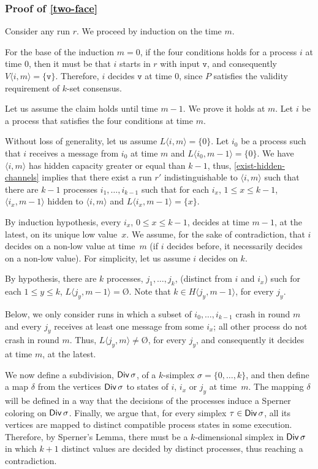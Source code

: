 \documentclass[11pt]{article}
\theoremstyle{definition}
\newcommand{\set}[1]{\{#1\}}
\def\emptyset{\mbox{\O}}
\DeclareMathOperator{\Div}{\sf Div}
\newcommand{\ang}[1]{\langle{#1}\rangle}
\begin{document}
\subsubsection{Proof of \texorpdfstring{\cref{two-face}}{Lemma~\ref{two-face}}}

Consider any run $r$. We proceed by induction on the time $m$.

For the base of the induction $m=0$, if the four conditions holds for
a process $i$ at time $0$, then it must be that
$i$ starts in $r$ with input $\mathtt{v}$,
and consequently $V\ang{i, m} = \set{\mathtt{v}}$.
Therefore, $i$ decides $\mathtt{v}$ at time $0$, since $P$ satisfies the validity requirement
of $k$-set consensus.

Let us assume the claim holds until time $m-1$. We prove it holds at $m$.
Let $i$ be a process that satisfies the four conditions at time $m$.

Without loss of generality, let us assume $L\ang{i,m}=\{0\}$.
Let $i_0$ be a process such that $i$ receives a message
from $i_0$ at time $m$ and $L\ang{i_0,m-1} = \set{0}$.
We have $\ang{i,m}$ has hidden capacity greater or equal than $k-1$,
thus,
\cref{exist-hidden-channels}
implies that
there exist a run $r'$ indistinguishable to $\ang{i,m}$ such that
there are $k-1$ processes $i_1, \hdots, i_{k-1}$
such that for each $i_x$, $1 \leq x \leq k-1$,
$\ang{i_x, m-1}$ hidden to $\ang{i,m}$
and $L\ang{i_x,m-1} = \set{x}$.

By induction hypothesis, every $i_x$, $0 \leq x \leq k-1$,
decides at time $m-1$, at the latest, on its unique low value~$x$.
We assume, for the sake of contradiction, that $i$ decides
on a non-low value at time~$m$
(if $i$ decides before, it necessarily decides on a non-low value).
For simplicity, let us assume $i$ decides on $k$.

By hypothesis, there are $k$ processes, $j_1, \hdots, j_k$,
(distinct from $i$ and $i_x$)
such for each $1 \leq y \leq k$, $L\ang{j_y, m-1} = \emptyset$.
Note that $k \in H\ang{j_y, m-1}$, for every $j_y$.

Below, we only consider runs in which
a subset of $i_0, \hdots, i_{k-1}$ crash in round $m$
and every $j_y$ receives at least one message from some $i_x$;
all other process do not crash in round $m$.
Thus, $L\ang{j_y, m} \neq \emptyset$, for every $j_y$,
and consequently it decides at time $m$, at the latest.

We now define a subdivision, $\Div \sigma$, of a $k$-simplex
$\sigma = \{ 0, \hdots, k \}$,
and then define a map $\delta$ from the vertices $\Div \sigma$ to
states of  $i$, $i_x$ or $j_y$ at time~$m$.
The mapping $\delta$ will be defined in a way that
the decisions of the processes induce a Sperner coloring on $\Div \sigma$.
Finally, we argue that,
for every simplex $\tau \in \Div \sigma$,
all its vertices are mapped to distinct compatible process states
in some execution.
Therefore, by Sperner's Lemma, there must be a $k$-dimensional simplex in $\Div \sigma$
in which $k+1$ distinct values are decided by distinct processes,
thus reaching a contradiction.
\end{document}
